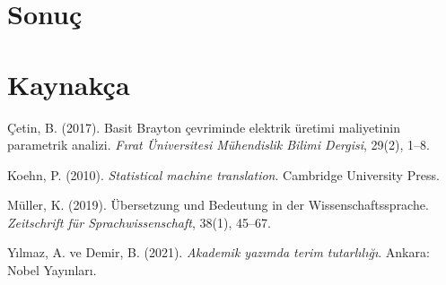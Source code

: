 \documentclass[10pt,a4paper]{article}
\begin{document}
\section{Sonuç}
\paragrafC

\section*{Kaynakça}
\begin{list}{}{\setlength{\leftmargin}{1.5em}\setlength{\itemindent}{-1.5em}\setlength{\itemsep}{2pt}\setlength{\parsep}{0pt}}
\item Çetin, B. (2017). Basit Brayton çevriminde elektrik üretimi maliyetinin parametrik analizi. \textit{Fırat Üniversitesi Mühendislik Bilimi Dergisi}, 29(2), 1--8.
\item Koehn, P. (2010). \textit{Statistical machine translation}. Cambridge University Press.
\item Müller, K. (2019). Übersetzung und Bedeutung in der Wissenschaftssprache. \textit{Zeitschrift für Sprachwissenschaft}, 38(1), 45--67.
\item Yılmaz, A. ve Demir, B. (2021). \textit{Akademik yazımda terim tutarlılığı}. Ankara: Nobel Yayınları.
\end{list}
\end{document}
